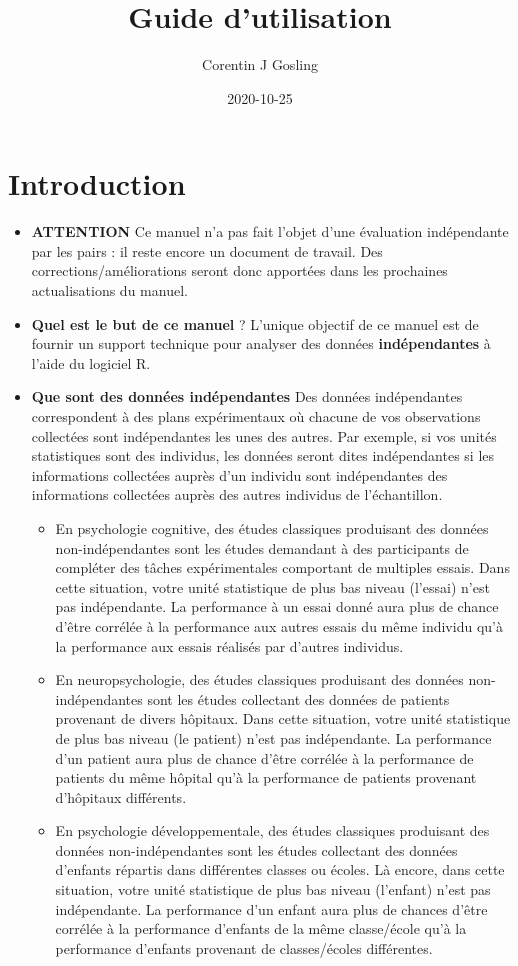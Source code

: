 \documentclass[
]{book}
\title{Guide d'utilisation}
\author{Corentin J Gosling}
\date{2020-10-25}
\begin{document}
\maketitle

{
\setcounter{tocdepth}{2}
\tableofcontents
}
\hypertarget{intro}{%
\chapter{Introduction}\label{intro}}

\begin{itemize}
\item
  \textbf{ATTENTION}
  Ce manuel n'a pas fait l'objet d'une évaluation indépendante par les pairs : il reste encore un document de travail. Des corrections/améliorations seront donc apportées dans les prochaines actualisations du manuel.
\item
  \textbf{Quel est le but de ce manuel} ?
  L'unique objectif de ce manuel est de fournir un support technique pour analyser des données \textbf{indépendantes} à l'aide du logiciel R.
\item
  \textbf{Que sont des données indépendantes}
  Des données indépendantes correspondent à des plans expérimentaux où chacune de vos observations collectées sont indépendantes les unes des autres. Par exemple, si vos unités statistiques sont des individus, les données seront dites indépendantes si les informations collectées auprès d'un individu sont indépendantes des informations collectées auprès des autres individus de l'échantillon.

  \begin{itemize}
  \item
    En psychologie cognitive, des études classiques produisant des données non-indépendantes sont les études demandant à des participants de compléter des tâches expérimentales comportant de multiples essais. Dans cette situation, votre unité statistique de plus bas niveau (l'essai) n'est pas indépendante. La performance à un essai donné aura plus de chance d'être corrélée à la performance aux autres essais du même individu qu'à la performance aux essais réalisés par d'autres individus.
  \item
    En neuropsychologie, des études classiques produisant des données non-indépendantes sont les études collectant des données de patients provenant de divers hôpitaux. Dans cette situation, votre unité statistique de plus bas niveau (le patient) n'est pas indépendante. La performance d'un patient aura plus de chance d'être corrélée à la performance de patients du même hôpital qu'à la performance de patients provenant d'hôpitaux différents.
  \item
    En psychologie développementale, des études classiques produisant des données non-indépendantes sont les études collectant des données d'enfants répartis dans différentes classes ou écoles. Là encore, dans cette situation, votre unité statistique de plus bas niveau (l'enfant) n'est pas indépendante. La performance d'un enfant aura plus de chances d'être corrélée à la performance d'enfants de la même classe/école qu'à la performance d'enfants provenant de classes/écoles différentes.
  \end{itemize}
\end{itemize}
\end{document}

